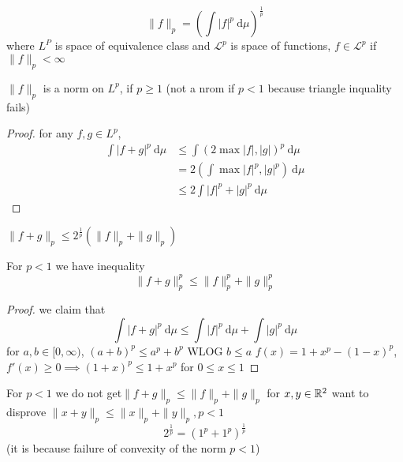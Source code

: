 
  

\begin{definition}
  \[\|f\|_p = \left(\int |f|^p \ \mathrm{d}\mu\right)^{\frac1p}\]
  where $L^P$ is space of equivalence class and $\mathcal{L}^p$ is space of functions,
  $f \in \mathcal{L}^p$ if $\|f\|_p < \infty$
\end{definition}

\begin{theorem}
  $\|f\|_p$ is a norm on $L^p$, if $p \ge 1$ (not a nrom if $p < 1$ because triangle inquality fails)
\end{theorem}
\begin{proof}
  for any $f, g \in L^p$, 
  \begin{align*}
    \int |f+g|^p \ \mathrm{d}\mu &\le \int (2 \max{|f|,|g|})^p \ \mathrm{d}\mu \\
    &= 2\left(\int \max |f|^p, |g|^p\right) \ \mathrm{d}\mu \\
    &\le 2\int |f|^p + |g|^p\ \mathrm{d}\mu 
  \end{align*}
\end{proof}

\begin{remark}
  $\|f+g\|_p \le 2^{\frac1p}(\|f\|_p + \|g\|_p)$
\end{remark}

\begin{theorem}
  For $p < 1$ we have inequality
  \[\|f+g\|_p^p \le \|f\|_p^p + \|g\|_p^p\]
\end{theorem}

\begin{proof}
  we claim that
  \[\int |f+g|^p \ \mathrm{d}\mu \le \int |f|^p \ \mathrm{d}\mu + \int |g|^p\ \mathrm{d}\mu\]
  for $a, b \in [0, \infty)$, $(a+b)^p \le a^p + b^p$
  WLOG $b \le a$
  $f(x) = 1+x^p - (1-x)^p$, $f'(x) \ge 0 \implies (1+x)^p \le 1 + x^p$ for $0 \le x \le 1$ 
\end{proof}

\begin{remark}
  For $p < 1$ we do not get$\|f+g\|_p \le \|f\|_p + \|g\|_p$
  for $x, y \in \mathbb R^2$ want to disprove $\|x+y\|_p \le \|x\|_p + \|y\|_p, p < 1$
  $$2^{\frac1p} = (1^p + 1^p)^{\frac1p}$$ (it is because failure of convexity of the norm $p < 1$)
\end{remark}




